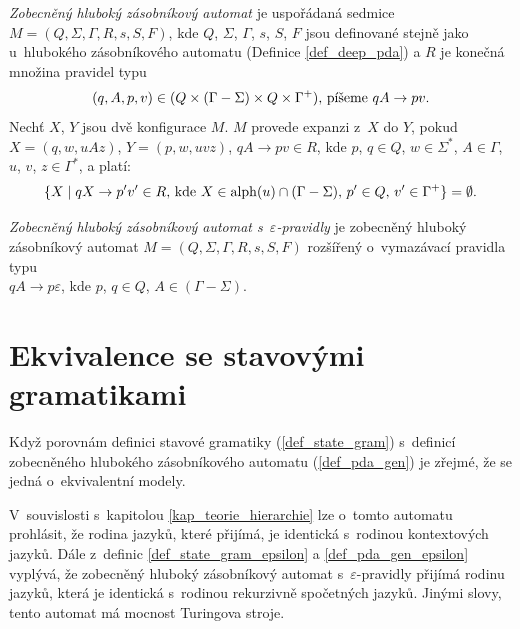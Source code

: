 \begin{Def} \label{def_pda_gen}
\emph{Zobecněný hluboký zásobníkový automat} je uspořádaná sedmice \\$M = (Q,\Sigma,\Gamma, R, s, S, F)$, 
kde $Q$, $\Sigma$, $\Gamma$, $s$, $S$, $F$ jsou definované stejně jako u~hlubokého zásobníkového automatu (Definice \ref{def_deep_pda}) a $R$ je konečná množina pravidel typu 
\begin{equation*} 
(q, A, p, v) \in (Q \times (\Gamma-\Sigma) \times Q \times {\Gamma}^+)\textnormal{, píšeme }qA \rightarrow pv. 
\end{equation*}
Nechť $X$, $Y$ jsou dvě konfigurace $M$.  $M$ provede expanzi z~$X$ do $Y$, pokud $X = (q, w, uAz)$, $Y = (p, w, uvz)$, $qA \rightarrow pv \in R$, kde $p$, $q \in Q$, $w \in \Sigma^*$, $A \in \Gamma$, $u$, $v$, $z \in \Gamma^*$, a platí:
\begin{equation*} 
\{X \mid qX \rightarrow p'v' \in R\textnormal{, kde }X \in \mathrm{alph}(u) \cap (\Gamma - \Sigma)\textnormal{, }p' \in Q\textnormal{, }v' \in {\Gamma}^+ \} = \emptyset. 
\end{equation*}
\end{Def}

\begin{Def}\label{def_pda_gen_epsilon}
\emph{Zobecněný hluboký zásobníkový automat s~$\varepsilon$-pravidly} je zobecněný hluboký zásobníkový automat $M = (Q,\Sigma,\Gamma, R, s, S, F)$ rozšířený o~vymazávací pravidla typu\\ $qA \rightarrow p\varepsilon$, kde $p$, $q \in Q$, $A \in (\Gamma - \Sigma)$.
\end{Def}


 \section{Ekvivalence se stavovými gramatikami} \label{sec_ekv_state_grammars}

Když porovnám definici stavové gramatiky (\ref{def_state_gram}) s~definicí zobecněného hlubokého zásobníkového automatu (\ref{def_pda_gen}) je zřejmé, že se jedná o~ekvivalentní modely.

V~souvislosti s~kapitolou \ref{kap_teorie_hierarchie} lze o~tomto automatu prohlásit, že rodina jazyků, které přijímá, je identická s~rodinou kontextových jazyků. Dále z~definic \ref{def_state_gram_epsilon} a \ref{def_pda_gen_epsilon} vyplývá, že zobecněný hluboký zásobníkový automat s~$\varepsilon$-pravidly přijímá rodinu jazyků, která je identická s~rodinou  rekurzivně spočetných jazyků. Jinými slovy, tento automat má mocnost Turingova stroje.

